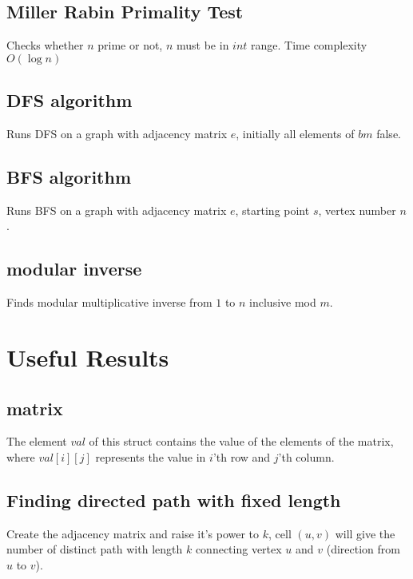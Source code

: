 \documentclass[8pt, a4paper, twocolumn]{article}
\begin{document}
\subsection{Miller Rabin Primality Test}
Checks whether $n$ prime or not, $n$ must be in $int$ range. Time complexity $O(\log n)$


\subsection{DFS algorithm}
Runs DFS on a graph with adjacency matrix $e$, initially all elements of $bm$ false.


\subsection{BFS algorithm}
Runs BFS on a graph with adjacency matrix $e$, starting point $s$, vertex number $n$.


\subsection{modular inverse}
Finds modular multiplicative inverse from $1$ to $n$ inclusive mod $m$.


\section{Useful Results}

\subsection{matrix}
The element $val$ of this struct contains the value of the elements of the matrix, where $val[i][j]$ represents the value in $i$'th row and $j$'th column.



\subsection{Finding directed path with fixed length}
Create the adjacency matrix and raise it's power to $k$, cell $(u,v)$ will give the number of distinct path with length $k$ connecting vertex $u$ and $v$ (direction from $u$ to $v$).
\end{document}
